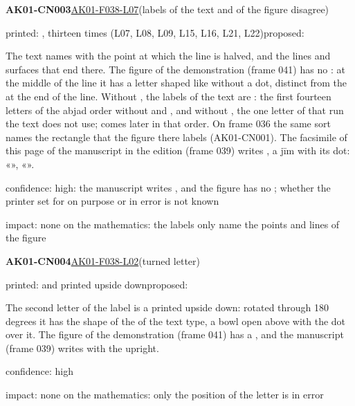 \documentclass[11pt]{article}
\begin{document}
\noindent\textbf{AK01-CN003}\enspace\hyperlink{AK01-F038-L07}{AK01-F038-L07}\enspace(labels of the text and of the figure disagree)\par\noindent printed: , thirteen times (L07, L08, L09, L15, L16, L21, L22)\enspace proposed: \par\noindent The text names with  the point at which the line  is halved, and the lines and surfaces that end there. The figure of the demonstration (frame 041) has no : at the middle of the line  it has a letter shaped like  without a dot, distinct from the  at the end of the line. Without , the labels of the text are : the first fourteen letters of the abjad order without  and , and without , the one letter of that run the text does not use;  comes later in that order. On frame 036 the same sort names the rectangle that the figure there labels  (AK01-CN001). The facsimile of this page of the manuscript in the edition (frame 039) writes , a jīm with its dot: «», «».\par\noindent confidence: high: the manuscript writes , and the figure has no ; whether the printer set  for  on purpose or in error is not known\par\noindent impact: none on the mathematics: the labels only name the points and lines of the figure\par\medskip
\noindent\textbf{AK01-CN004}\enspace\hyperlink{AK01-F038-L02}{AK01-F038-L02}\enspace(turned letter)\par\noindent printed:  and  printed upside down\enspace proposed: \par\noindent The second letter of the label  is a  printed upside down: rotated through 180 degrees it has the shape of the  of the text type, a bowl open above with the dot over it. The figure of the demonstration (frame 041) has a , and the manuscript (frame 039) writes  with the  upright.\par\noindent confidence: high\par\noindent impact: none on the mathematics: only the position of the letter is in error\par\medskip
\end{document}
